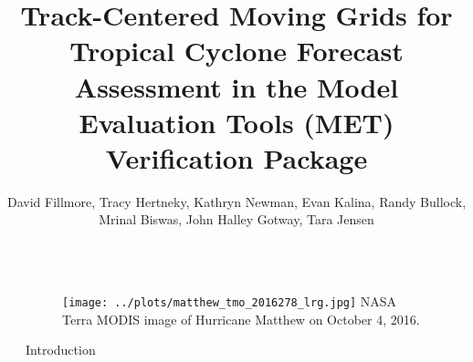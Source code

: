 \documentclass[final]{beamer}
\title{
Track-Centered Moving Grids for Tropical Cyclone Forecast Assessment
in the Model Evaluation Tools (MET) Verification Package} %
\author{David Fillmore, Tracy Hertneky, Kathryn Newman,
Evan Kalina, Randy Bullock, Mrinal Biswas,
John Halley Gotway, Tara Jensen} %
\institute{National Center for Atmospheric Research,
Research Applications Lab} %
\newlength{\sepwid}
\newlength{\onecolwid}
\begin{document}

\setlength{\belowcaptionskip}{2ex} %
\setlength\belowdisplayshortskip{2ex} %

\begin{frame}[containsverbatim] %

\begin{columns}[t] %

\begin{column}{\sepwid}\end{column} %

\begin{column}{\onecolwid} %




\begin{figure}
\texttt{[image: ../plots/matthew\_tmo\_2016278\_lrg.jpg]}
\newline
{\small NASA Terra MODIS image of Hurricane Matthew on October 4, 2016.}
\end{figure}

\begin{block}{Introduction}

\end{block}



\end{column}
\end{columns}
\end{frame}
\end{document}
